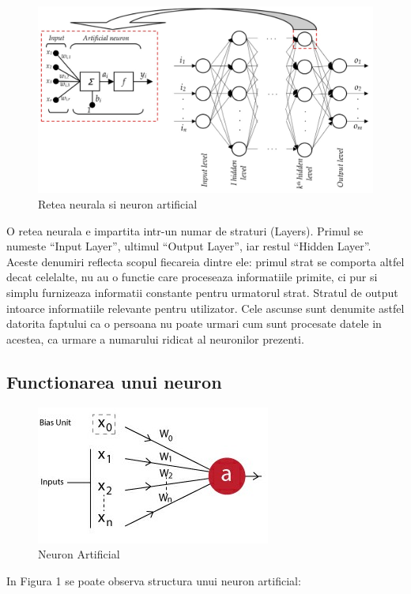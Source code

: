 \documentclass{article}
\begin{document}
\begin{figure}[H]
\includegraphics{ANN_Structure}
\caption{Retea neurala si neuron artificial \cite{Deep_Learning}}
\end{figure}

O retea neurala e impartita intr-un numar de straturi (Layers). Primul se numeste ``Input Layer'', ultimul ``Output Layer'', iar restul ``Hidden Layer''. Aceste denumiri reflecta scopul fiecareia dintre ele: primul strat se comporta altfel decat celelalte, nu au o functie care proceseaza informatiile primite, ci pur si simplu furnizeaza informatii constante pentru urmatorul strat. Stratul de output intoarce informatiile relevante pentru utilizator. Cele ascunse sunt denumite astfel datorita faptului ca o persoana nu poate urmari cum sunt procesate datele in acestea, ca urmare a numarului ridicat al neuronilor prezenti.

\subsection{Functionarea unui neuron}

\begin{figure}[H]
	\includegraphics[scale=0.5]{neuron_s}
	\caption{Neuron Artificial \cite{Deep_Learning}}
\end{figure}

In Figura 1 se poate observa structura unui neuron artificial:\\
\end{document}
